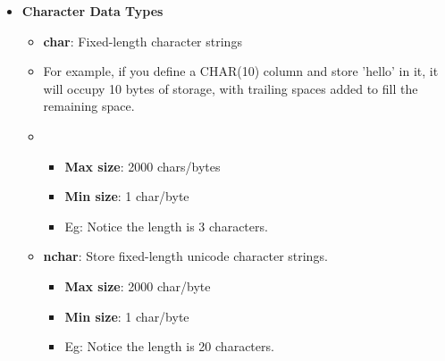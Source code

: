 
\begin{flushleft}
	
	
	\begin{itemize}
		\item \textbf{Character Data Types}
		\begin{itemize}
			\item \textbf{char}: Fixed-length character strings
			\bigskip
			\item For example, if you define a CHAR(10) column and store 'hello' in it, it will occupy 10 bytes of storage, with trailing spaces added to fill the remaining space.

			\item 
			
			\begin{itemize}	
				\item \textbf{Max size}: 2000 chars/bytes
				\item \textbf{Min size}: 1 char/byte
				\item Eg:
				Notice the length is 3 characters.
			\end{itemize}

			\bigskip
			\item \textbf{nchar}: Store fixed-length unicode character strings.
			\begin{itemize}
				\item \textbf{Max size}: 2000 char/byte
				\item \textbf{Min size}: 1 char/byte
				\item Eg:
				Notice the length is 20 characters.
			\end{itemize}


\end{itemize}
\end{itemize}
\end{flushleft}

